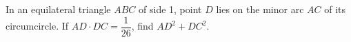 In an equilateral triangle $ABC$ of side 1, point $D$ lies on the minor arc $AC$ of its circumcircle. If $A D \cdot D C = \dfrac{1}{26}$, find $AD^2+DC^2$.
